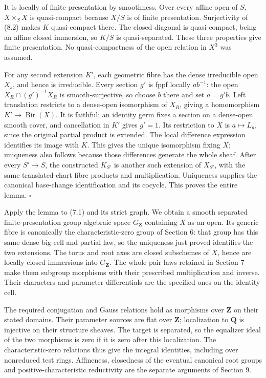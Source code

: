 \documentclass[11pt,a4paper,openany]{report}
\begin{document}
It is locally of finite presentation by smoothness. Over every affine open of \(S\), \(X\times_SX\) is quasi-compact because \(X/S\) is of finite presentation. Surjectivity of (8.2) makes \(K\) quasi-compact there. The closed diagonal is quasi-compact, being an affine closed immersion, so \(K/S\) is quasi-separated. These three properties give finite presentation. No quasi-compactness of the open relation in \(X^3\) was assumed.

For any second extension \(K'\), each geometric fibre has the dense irreducible open \(X_s\), and hence is irreducible. Every section \(g'\) is fppf locally \(ab^{-1}\): the open \(X_R\cap (g')^{-1}X_R\) is smooth-surjective, so choose \(b\) there and set \(a=g'b\). Left translation restricts to a dense-open isomorphism of \(X_R\), giving a homomorphism \(K'\to\operatorname{Bir}(X)\). It is faithful: an identity germ fixes a section on a dense-open smooth cover, and cancellation in \(K'\) gives \(g'=1\). Its restriction to \(X\) is \(a\mapsto L_a\), since the original partial product is extended. The local difference expression identifies its image with \(K\). This gives the unique isomorphism fixing \(X\); uniqueness also follows because those differences generate the whole sheaf. After every \(S'\to S\), the constructed \(K_{S'}\) is another such extension of \(X_{S'}\), with the same translated-chart fibre products and multiplication. Uniqueness supplies the canonical base-change identification and its cocycle. This proves the entire lemma. \(\square\)

Apply the lemma to (7.1) and its strict graph. We obtain a smooth separated finite-presentation group algebraic space \(G_{\mathbf Z}\) containing \(X\) as an open. Its generic fibre is canonically the characteristic-zero group of Section 6: that group has this same dense big cell and partial law, so the uniqueness just proved identifies the two extensions. The torus and root axes are closed subschemes of \(X\), hence are locally closed immersions into \(G_{\mathbf Z}\). The whole pair laws retained in Section 7 make them subgroup morphisms with their prescribed multiplication and inverse. Their characters and parameter differentials are the specified ones on the identity cell.

The required conjugation and Gauss relations hold as morphisms over \(\mathbf Z\) on their stated domains. Their parameter sources are flat over \(\mathbf Z\); localization to \(\mathbf Q\) is injective on their structure sheaves. The target is separated, so the equalizer ideal of the two morphisms is zero if it is zero after this localization. The characteristic-zero relations thus give the integral identities, including over nonreduced test rings. Affineness, closedness of the eventual canonical root groups and positive-characteristic reductivity are the separate arguments of Section 9.
\end{document}
